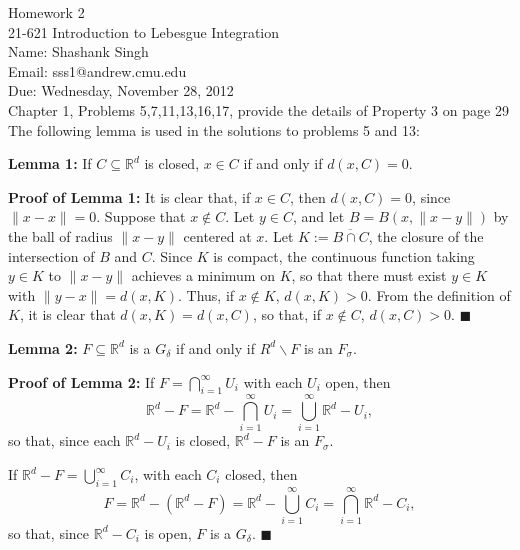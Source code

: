 \documentclass[11pt]{article}
\makeatletter
\newcommand{\myname}{Shashank Singh}
\newcommand{\myandrew}{sss1@andrew.cmu.edu}
\newcommand{\myclass}{21-621 Introduction to Lebesgue Integration}
\newcommand{\myhwnum}{2}
\newcommand{\duedate}{Wednesday, November 28, 2012}
\newcommand{\problemlist}{Chapter 1, Problems 5,7,11,13,16,17, provide the
details of Property 3 on page 29}
\renewcommand{\qed}{\quad $\blacksquare$}
\newcommand{\sminus}{\backslash}
\newcommand{\R}{\mathbb{R}} %
\makeatother
\begin{document}
\thispagestyle{plain}

{\Large Homework \myhwnum} \\
\myclass \\
Name: \myname \\
Email: \myandrew \\
Due: \duedate \\
\problemlist \\

The following lemma is used in the solutions to problems 5 and 13:

{\bf Lemma 1:} If $C \subseteq \R^d$ is closed, $x \in C$ if and only
if $d(x,C) = 0$.

{\bf Proof of Lemma 1:} It is clear that, if $x \in C$, then $d(x,C) = 0$,
since $\|x - x\| = 0$. Suppose that $x \notin C$. Let $y \in C$, and let
$B = B(x, \|x - y\|)$ by the ball of radius $\|x - y\|$ centered at $x$. Let
$K := \overline{B \cap C}$, the closure of the intersection of $B$ and $C$.
Since $K$ is compact, the continuous function taking $y \in K$ to $\|x - y\|$
achieves a minimum on $K$, so that there must exist $y \in K$ with
$\|y - x\| = d(x,K)$. Thus, if $x \notin K$, $d(x,K) > 0$. From the definition
of $K$, it is clear that $d(x,K) = d(x,C)$, so that, if $x \notin C$,
$d(x,C) > 0$. \qed

{\bf Lemma 2:} $F \subseteq \R^d$ is a $G_{\delta}$ if and only if
$R^d \sminus F$ is an $F_{\sigma}$.

{\bf Proof of Lemma 2:} If $F = \bigcap_{i = 1}^{\infty} U_i$ with each $U_i$
open, then
\[ \R^d - F
 = \R^d - \bigcap_{i = 1}^{\infty} U_i 
 = \bigcup_{i = 1}^{\infty} \R^d - U_i,
\]
so that, since each $\R^d - U_i$ is closed, $\R^d - F$ is an $F_{\sigma}$.

If $\R^d - F = \bigcup_{i = 1}^{\infty} C_i$, with each $C_i$ closed, then
\[ F
 = \R^d - (\R^d - F)
 = \R^d - \bigcup_{i = 1}^{\infty} C_i 
 = \bigcap_{i = 1}^{\infty} \R^d - C_i,
\]
so that, since $\R^d - C_i$ is open, $F$ is a $G_{\delta}$. \qed
\end{document}

